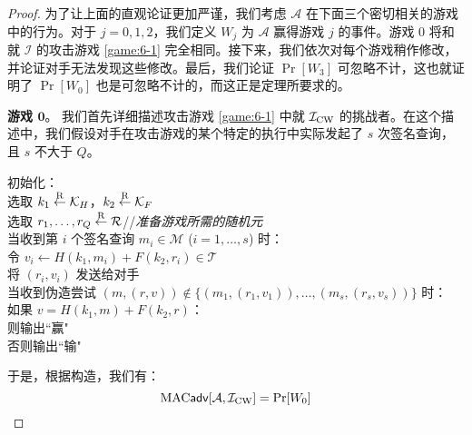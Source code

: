 \begin{proof}
为了让上面的直观论证更加严谨，我们考虑 $\mathcal{A}$ 在下面三个密切相关的游戏中的行为。对于 $j=0,1,2$，我们定义 $W_j$ 为 $\mathcal{A}$ 赢得游戏 $j$ 的事件。游戏 $0$ 将和就 $\mathcal{I}$ 的攻击游戏 \ref{game:6-1} 完全相同。接下来，我们依次对每个游戏稍作修改，并论证对手无法发现这些修改。最后，我们论证 $\Pr[W_3]$ 可忽略不计，这也就证明了 $\Pr[W_0]$ 也是可忽略不计的，而这正是定理所要求的。

\vspace{5pt}

\noindent\textbf{游戏 $\mathbf{0}$}。
我们首先详细描述攻击游戏 \ref{game:6-1} 中就 $\mathcal{I}_{\rm CW}$ 的挑战者。在这个描述中，我们假设对手在攻击游戏的某个特定的执行中实际发起了 $s$ 次签名查询，且 $s$ 不大于 $Q$。

\vspace{5pt}

\hspace*{5pt} 初始化：\\
\hspace*{50pt} 选取 $k_1\overset{\rm R}\leftarrow\mathcal{K}_H$，$k_2\overset{\rm R}\leftarrow\mathcal{K}_F$\\
\hspace*{50pt} 选取 $r_1,\dots,r_Q\overset{\rm R}\leftarrow\mathcal{R}$\quad//\quad\emph{准备游戏所需的随机元}\\
\hspace*{26pt} 当收到第 $i$ 个签名查询 $m_i\in\mathcal{M}$ ($i=1,\dots,s$) 时：\\
\hspace*{50pt} 令 $v_i\leftarrow H(k_1,m_i)+F(k_2,r_i)\in\mathcal{T}$\\
\hspace*{50pt} 将 $(r_i,v_i)$ 发送给对手\\
\hspace*{26pt} 当收到伪造尝试 $(m,(r,v))\notin\{(m_1,(r_1,v_1)),\dots,(m_s,(r_s,v_s))\}$ 时：\\
\hspace*{50pt} 如果 $v=H(k_1,m)+F(k_2,r)$：\\
\hspace*{75pt} 则输出``赢"\\
\hspace*{75pt} 否则输出``输"

\vspace{5pt}

\noindent
于是，根据构造，我们有：
\begin{equation}\label{eq:7-25}
{\rm MAC}\mathsf{adv}[\mathcal{A},\mathcal{I}_{\rm CW}]=\Pr[W_0]
\end{equation}


\end{proof}
